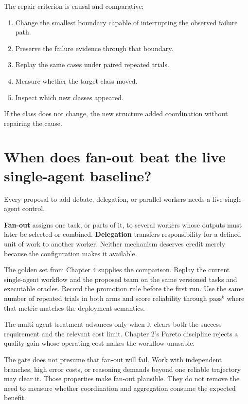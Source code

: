 
The repair criterion is causal and comparative:

\begin{enumerate}
\def\labelenumi{\arabic{enumi}.}
\tightlist
\item
  Change the smallest boundary capable of interrupting the observed failure path.
\item
  Preserve the failure evidence through that boundary.
\item
  Replay the same cases under paired repeated trials.
\item
  Measure whether the target class moved.
\item
  Inspect which new classes appeared.
\end{enumerate}

If the class does not change, the new structure added coordination without repairing the cause.

\hypertarget{when-does-fan-out-beat-the-live-single-agent-baseline}{%
\section{When does fan-out beat the live single-agent baseline?}\label{when-does-fan-out-beat-the-live-single-agent-baseline}}

Every proposal to add debate, delegation, or parallel workers needs a live single-agent control.

\textbf{Fan-out} assigns one task, or parts of it, to several workers whose outputs must later be selected or combined. \textbf{Delegation} transfers responsibility for a defined unit of work to another worker. Neither mechanism deserves credit merely because the configuration makes it available.

The golden set from Chapter 4 supplies the comparison. Replay the current single-agent workflow and the proposed team on the same versioned tasks and executable oracles. Record the promotion rule before the first run. Use the same number of repeated trials in both arms and score reliability through \(\mathrm{pass}^{k}\) where that metric matches the deployment semantics.

The multi-agent treatment advances only when it clears both the success requirement and the relevant cost limit. Chapter 2's Pareto discipline rejects a quality gain whose operating cost makes the workflow unusable.

The gate does not presume that fan-out will fail. Work with independent branches, high error costs, or reasoning demands beyond one reliable trajectory may clear it. Those properties make fan-out plausible. They do not remove the need to measure whether coordination and aggregation consume the expected benefit.

